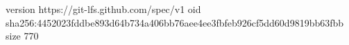 version https://git-lfs.github.com/spec/v1
oid sha256:4452023fddbe893d64b734a406bb76aee4ee3fbfeb926cf5dd60d9819bb63fbb
size 770
